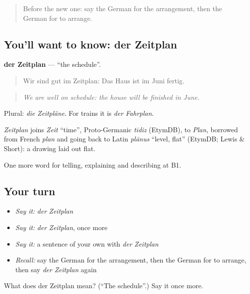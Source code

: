 \begin{quote}
Before the new one: say the German for the arrangement, then the German for to arrange.
\end{quote}

\subsection*{You'll want to know: der Zeitplan}
\textbf{der Zeitplan} — \textquotedblleft{}the schedule\textquotedblright{}.

\begin{quote}
Wir sind gut im Zeitplan: Das Haus ist im Juni fertig.
\end{quote}

\begin{quote}
\emph{We are well on schedule: the house will be finished in June.}
\end{quote}

Plural: \emph{die Zeitpläne}. For trains it is \emph{der Fahrplan}.

\begin{cousinweb}
\emph{Zeitplan} joins \emph{Zeit} \textquotedblleft{}time\textquotedblright{}, Proto-Germanic \emph{tīdiz} (EtymDB), to \emph{Plan}, borrowed from French \emph{plan} and going back to Latin \emph{plānus} \textquotedblleft{}level, flat\textquotedblright{} (EtymDB; Lewis \& Short): a drawing laid out flat.
\end{cousinweb}

\begin{grammarlens}[title={What you've built}]
One more word for telling, explaining and describing at B1.
\end{grammarlens}

\subsection*{Your turn}
\begin{itemize}
\raggedright
  \item \emph{Say it:} \emph{der Zeitplan}
  \item \emph{Say it:} \emph{der Zeitplan}, once more
  \item \emph{Say it:} a sentence of your own with \emph{der Zeitplan}
  \item \emph{Recall:} say the German for the arrangement, then the German for to arrange, then say \emph{der Zeitplan} again
\end{itemize}

\begin{tcolorbox}[breakable,colback=teal!4,colframe=teal!35!black,title={Before you move on}]
What does der Zeitplan mean? (\textquotedblleft{}The schedule\textquotedblright{}.) Say it once more.
\end{tcolorbox}

